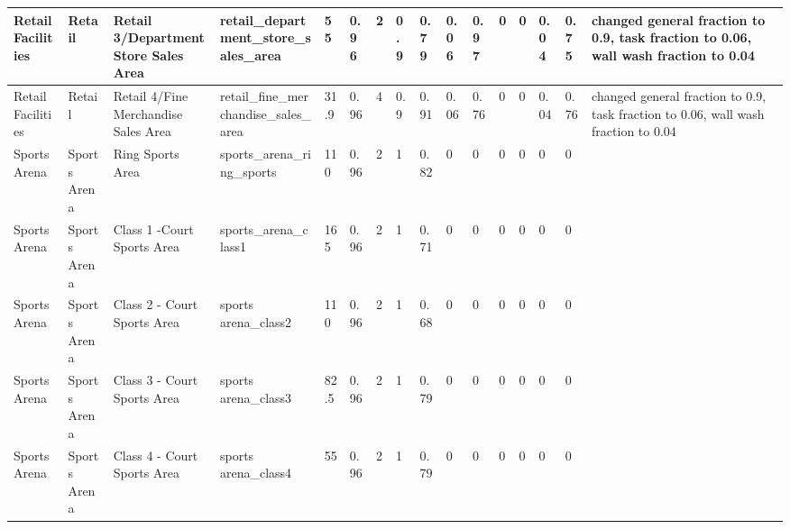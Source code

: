 \begin{center}
\begin{landscape}
\begin{longtable}{|p{0.75in}|p{0.75in}|p{0.75in}|p{0.75in}|p{0.3in}|p{0.3in}|p{0.3in}|p{0.3in}|p{0.3in}|p{0.3in}|p{0.3in}|p{0.3in}|p{0.3in}|p{0.3in}|p{0.3in}|p{0.6in}|}
      Retail Facilities                       & Retail                      & Retail 3/Department Store Sales Area          & retail\_department\_store\_sales\_area                          & 55   & 0.96 & 2  & 0.9    & 0.79  & 0.06  & 0.97  & 0    & 0    & 0.04 & 0.75 & changed general fraction to 0.9, task fraction to 0.06, wall wash fraction to 0.04  \\ \hline
      Retail Facilities                       & Retail                      & Retail 4/Fine Merchandise Sales Area          & retail\_fine\_merchandise\_sales\_area                          & 31.9 & 0.96 & 4  & 0.9    & 0.91  & 0.06  & 0.76  & 0    & 0    & 0.04 & 0.76 & changed general fraction to 0.9, task fraction to 0.06, wall wash fraction to 0.04  \\ \hline
      Sports Arena                            & Sports Arena                & Ring Sports Area                                & sports\_arena\_ring\_sports                                     & 110  & 0.96 & 2  & 1      & 0.82  & 0     & 0     & 0    & 0    & 0    & 0    &                                                                                       \\ \hline
      Sports Arena                            & Sports Arena                & Class 1 -Court Sports Area                      & sports\_arena\_class1                                           & 165  & 0.96 & 2  & 1      & 0.71  & 0     & 0     & 0    & 0    & 0    & 0    &                                                                                       \\ \hline
      Sports Arena                            & Sports Arena                & Class 2 - Court Sports Area                     & sports arena\_class2                                            & 110  & 0.96 & 2  & 1      & 0.68  & 0     & 0     & 0    & 0    & 0    & 0    &                                                                                       \\ \hline
      Sports Arena                            & Sports Arena                & Class 3 - Court Sports Area                     & sports arena\_class3                                            & 82.5 & 0.96 & 2  & 1      & 0.79  & 0     & 0     & 0    & 0    & 0    & 0    &                                                                                       \\ \hline
      Sports Arena                            & Sports Arena                & Class 4 - Court Sports Area                     & sports arena\_class4                                            & 55   & 0.96 & 2  & 1      & 0.79  & 0     & 0     & 0    & 0    & 0    & 0    &                                                                                       \\ \hline

\end{longtable}
\end{landscape}
\end{center}
